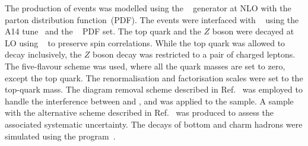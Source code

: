 The production of \tWZ events was modelled using the \MGNLO[2.3.3]~\cite{Alwall:2014hca}
generator at NLO with the \NNPDF[3.0nlo]~\cite{Ball:2014uwa} parton distribution function~(PDF).
The events were interfaced with
\PYTHIA[8.212]~\cite{Sjostrand:2014zea} using the A14 tune~\cite{ATL-PHYS-PUB-2014-021} and the \NNPDF[2.3lo]~\cite{Ball:2014uwa} PDF set.
The top quark and the \(Z\) boson were decayed at LO using \MADSPIN~\cite{Frixione:2007zp,Artoisenet:2012st} to preserve spin correlations.
While the top quark was allowed to decay inclusively, the \(Z\) boson decay was restricted to a pair of charged leptons.
The five-flavour scheme was used, where all the quark masses are set to zero, except the top quark.
The renormalisation and factorisation scales were set to the top-quark mass.
The diagram removal scheme described in Ref.~\cite{Frixione:2008yi} was employed to handle the interference
between \tWZ and \ttZ, and was applied to the \tWZ sample.
A sample with the alternative scheme described in Ref.~\cite{Demartin:2016axk} was produced to assess the associated systematic uncertainty.
The decays of bottom and charm hadrons were simulated using the \EVTGEN[1.2.0] program~\cite{Lange:2001uf}.

